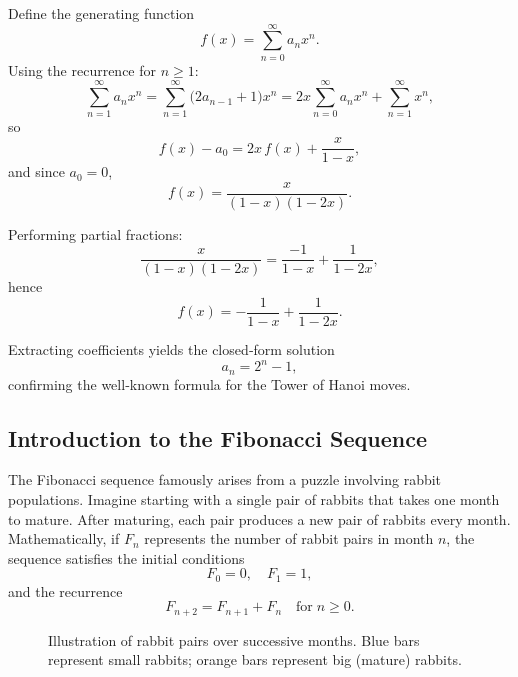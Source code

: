 \documentclass{article}
\begin{document}
Define the generating function
\[
f(x) = \sum_{n=0}^\infty a_n x^n.
\]
Using the recurrence for \(n\ge1\):
\[
\sum_{n=1}^\infty a_n x^n 
= \sum_{n=1}^\infty \bigl(2a_{n-1}+1\bigr)x^n
= 2x\sum_{n=0}^\infty a_n x^n + \sum_{n=1}^\infty x^n,
\]
so
\[
f(x) - a_0 = 2x\,f(x) + \frac{x}{1-x},
\]
and since \(a_0=0\),
\[
f(x) = \frac{x}{(1-x)(1-2x)}.
\]

Performing partial fractions:
\[
\frac{x}{(1-x)(1-2x)}
= \frac{-1}{1-x} + \frac{1}{1-2x},
\]
hence
\[
f(x) = -\frac{1}{1-x} + \frac{1}{1-2x}.
\]

Extracting coefficients yields the closed‑form solution
\[
a_n = 2^n - 1,
\]
confirming the well‑known formula for the Tower of Hanoi moves.
\FloatBarrier

\subsection{Introduction to the Fibonacci Sequence}
The Fibonacci sequence famously arises from a puzzle involving rabbit populations.
Imagine starting with a single pair of rabbits that takes one month to mature.
After maturing, each pair produces a new pair of rabbits every month.
Mathematically, if \(F_n\) represents the number of rabbit pairs in month \(n\),
the sequence satisfies the initial conditions
\[
F_0 = 0, \quad F_1 = 1,
\]
and the recurrence
\[
F_{n+2} = F_{n+1} + F_n \quad \text{for} \; n \ge 0.
\]

\begin{figure}[ht]
  \centering
\caption{Illustration of rabbit pairs over successive months. 
Blue bars represent small rabbits; orange bars represent big (mature) rabbits.}
\end{figure}
\end{document}
